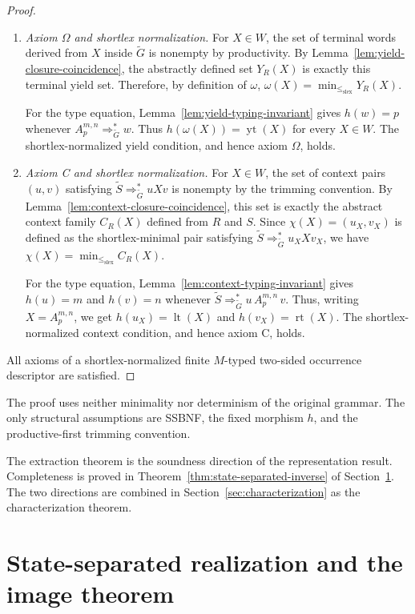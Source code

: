 \documentclass[sub]{jalc}
\newcommand{\yt}{\operatorname{yt}}
\newcommand{\lt}{\operatorname{lt}}
\newcommand{\rt}{\operatorname{rt}}
\newcommand{\slex}{\leq_{\mathrm{slex}}}
\newcommand{\Gtrim}{\widetilde G}
\begin{document}
\begin{proof}
\begin{enumerate}[label=\textup{(\arabic*)},leftmargin=2.4em]
\item \emph{Axiom \(\Omega\) and shortlex normalization.} For \(X\in W\), the set of terminal words derived from \(X\) inside \(\Gtrim\) is nonempty by productivity. By Lemma~\ref{lem:yield-closure-coincidence}, the abstractly defined set \(Y_R(X)\) is exactly this terminal yield set. Therefore, by definition of \(\omega\), \(\omega(X)=\min_{\slex}Y_R(X)\).

For the type equation, Lemma~\ref{lem:yield-typing-invariant} gives \(h(w)=p\) whenever \(A_p^{m,n}\Rightarrow_{\Gtrim}^*w\). Thus \(h(\omega(X))=\yt(X)\) for every \(X\in W\). The shortlex-normalized yield condition, and hence axiom \(\Omega\), holds.

\item \emph{Axiom C and shortlex normalization.} For \(X\in W\), the set of context pairs \((u,v)\) satisfying \(\widetilde S\Rightarrow_{\Gtrim}^*uXv\) is nonempty by the trimming convention. By Lemma~\ref{lem:context-closure-coincidence}, this set is exactly the abstract context family \(C_R(X)\) defined from \(R\) and \(S\). Since \(\chi(X)=(u_X,v_X)\) is defined as the shortlex-minimal pair satisfying \(\widetilde S\Rightarrow_{\Gtrim}^*u_XXv_X\), we have \(\chi(X)=\min_{\slex}C_R(X)\).

For the type equation, Lemma~\ref{lem:context-typing-invariant} gives \(h(u)=m\) and \(h(v)=n\) whenever \(\widetilde S\Rightarrow_{\Gtrim}^*u\,A_p^{m,n}\,v\). Thus, writing \(X=A_p^{m,n}\), we get \(h(u_X)=\lt(X)\) and \(h(v_X)=\rt(X)\). The shortlex-normalized context condition, and hence axiom C, holds.
\end{enumerate}

All axioms of a shortlex-normalized finite \(M\)-typed two-sided occurrence descriptor are satisfied.
\end{proof}

\begin{remark}
The proof uses neither minimality nor determinism of the original grammar. The only structural assumptions are SSBNF, the fixed morphism \(h\), and the productive-first trimming convention.
\end{remark}

The extraction theorem is the soundness direction of the representation result. Completeness is proved in Theorem~\ref{thm:state-separated-inverse} of Section~\ref{sec:inverse-representation}. The two directions are combined in Section~\ref{sec:characterization} as the characterization theorem.

\section{State-separated realization and the image theorem}
\label{sec:inverse-representation}
\end{document}
